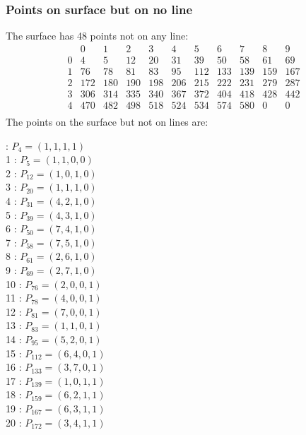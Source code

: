 \documentclass{article}
\begin{document}
{\subsubsection*{Points on surface but on no line}
The surface has 48 points not on any line:\\
$$
\begin{array}{r|*{10}{r}}
 & 0 & 1 & 2 & 3 & 4 & 5 & 6 & 7 & 8 & 9\\
\hline
0 & 4 & 5 & 12 & 20 & 31 & 39 & 50 & 58 & 61 & 69\\
1 & 76 & 78 & 81 & 83 & 95 & 112 & 133 & 139 & 159 & 167\\
2 & 172 & 180 & 190 & 198 & 206 & 215 & 222 & 231 & 279 & 287\\
3 & 306 & 314 & 335 & 340 & 367 & 372 & 404 & 418 & 428 & 442\\
4 & 470 & 482 & 498 & 518 & 524 & 534 & 574 & 580 & 0 & 0\\
\end{array}
$$
The points on the surface but not on lines are:\\
\begin{multicols}{2}
 : $P_{4}=( 1, 1, 1, 1 )$\\
1 : $P_{5}=( 1, 1, 0, 0 )$\\
2 : $P_{12}=( 1, 0, 1, 0 )$\\
3 : $P_{20}=( 1, 1, 1, 0 )$\\
4 : $P_{31}=( 4, 2, 1, 0 )$\\
5 : $P_{39}=( 4, 3, 1, 0 )$\\
6 : $P_{50}=( 7, 4, 1, 0 )$\\
7 : $P_{58}=( 7, 5, 1, 0 )$\\
8 : $P_{61}=( 2, 6, 1, 0 )$\\
9 : $P_{69}=( 2, 7, 1, 0 )$\\
10 : $P_{76}=( 2, 0, 0, 1 )$\\
11 : $P_{78}=( 4, 0, 0, 1 )$\\
12 : $P_{81}=( 7, 0, 0, 1 )$\\
13 : $P_{83}=( 1, 1, 0, 1 )$\\
14 : $P_{95}=( 5, 2, 0, 1 )$\\
15 : $P_{112}=( 6, 4, 0, 1 )$\\
16 : $P_{133}=( 3, 7, 0, 1 )$\\
17 : $P_{139}=( 1, 0, 1, 1 )$\\
18 : $P_{159}=( 6, 2, 1, 1 )$\\
19 : $P_{167}=( 6, 3, 1, 1 )$\\
20 : $P_{172}=( 3, 4, 1, 1 )$\\

\end{multicols}}
\end{document}
